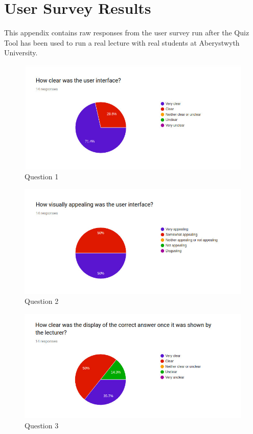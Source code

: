 \chapter{User Survey Results}
\label{chap:usersurvey}

This appendix contains raw responses from the user survey run after the Quiz
Tool has been used to run a real lecture with real students at Aberystwyth University.

\newpage
\begin{figure}[h!]
    \centering
    \includegraphics[width=\textwidth]{Appendix7/1.jpg}
    \caption{Question 1}
    \label{fig:survey1}
\end{figure}

\begin{figure}[h!]
    \centering
    \includegraphics[width=\textwidth]{Appendix7/2.jpg}
    \caption{Question 2}
    \label{fig:survey2}
\end{figure}

\begin{figure}[h!]
    \centering
    \includegraphics[width=\textwidth]{Appendix7/3.png}
    \caption{Question 3}
    \label{fig:survey3}
\end{figure}


